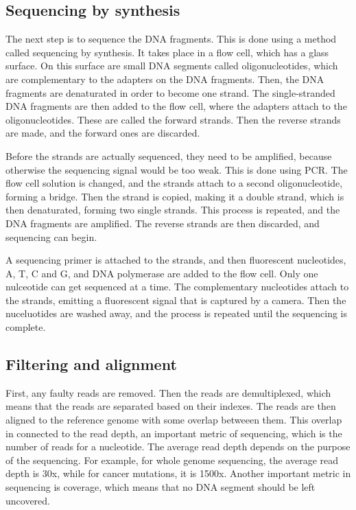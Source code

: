 \documentclass{article}
\begin{document}
\subsection{Sequencing by synthesis}
The next step is to sequence the DNA fragments. This is done using a method called sequencing by synthesis. It takes place in a flow cell, which has a glass surface. On this surface are small DNA segments called oligonucleotides, which are complementary to the adapters on the DNA fragments. Then, the DNA fragments are denaturated in order to become one strand. The single-stranded DNA fragments are then added to the flow cell, where the adapters attach to the oligonucleotides. These are called the forward strands. Then the reverse strands are made, and the forward ones are discarded. 

Before the strands are actually sequenced, they need to be amplified, because otherwise the sequencing signal would be too weak. This is done using PCR. The flow cell solution is changed, and the strands attach to a second oligonucleotide, forming a bridge. Then the strand is copied, making it a double strand, which is then denaturated, forming two single strands. This process is repeated, and the DNA fragments are amplified. The reverse strands are then discarded, and sequencing can begin.

A sequencing primer is attached to the strands, and then fluorescent nucleotides, A, T, C and G, and DNA polymerase are added to the flow cell. Only one nulceotide can get sequenced at a time. The complementary nucleotides attach to the strands, emitting a fluorescent signal that is captured by a camera. Then the nuceluotides are washed away, and the process is repeated until the sequencing is complete.

\subsection{Filtering and alignment}
First, any faulty reads are removed. Then the reads are demultiplexed, which means that the reads are separated based on their indexes. The reads are then aligned to the reference genome with some overlap betweeen them. This overlap in connected to the read depth, an important metric of sequencing, which is the number of reads for a nucleotide. The average read depth depends on the purpose of the sequencing. For example, for whole genome sequencing, the average read depth is 30x, while for cancer mutations, it is 1500x. Another important metric in sequencing is coverage, which means that no DNA segment should be left uncovered.
\end{document}

